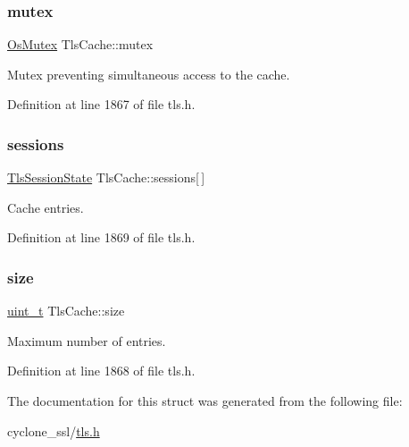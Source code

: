 \subsubsection{\texorpdfstring{mutex}{mutex}}
{\footnotesize\ttfamily \hyperlink{structOsMutex}{Os\+Mutex} Tls\+Cache\+::mutex}



Mutex preventing simultaneous access to the cache. 



Definition at line 1867 of file tls.\+h.

\mbox{\label{structTlsCache_adc79fbdfd19c6c9a1fbcf14e23404df5}} 
\subsubsection{\texorpdfstring{sessions}{sessions}}
{\footnotesize\ttfamily \hyperlink{structTlsSessionState}{Tls\+Session\+State} Tls\+Cache\+::sessions\mbox{[}$\,$\mbox{]}}



Cache entries. 



Definition at line 1869 of file tls.\+h.

\mbox{\label{structTlsCache_a796ebf2823471af019a1c6a16bb2a505}} 
\subsubsection{\texorpdfstring{size}{size}}
{\footnotesize\ttfamily \hyperlink{compiler__port_8h_a12a1e9b3ce141648783a82445d02b58d}{uint\+\_\+t} Tls\+Cache\+::size}



Maximum number of entries. 



Definition at line 1868 of file tls.\+h.



The documentation for this struct was generated from the following file\+:\begin{DoxyCompactItemize}
\item 
cyclone\+\_\+ssl/\hyperlink{tls_8h}{tls.\+h}\end{DoxyCompactItemize}
